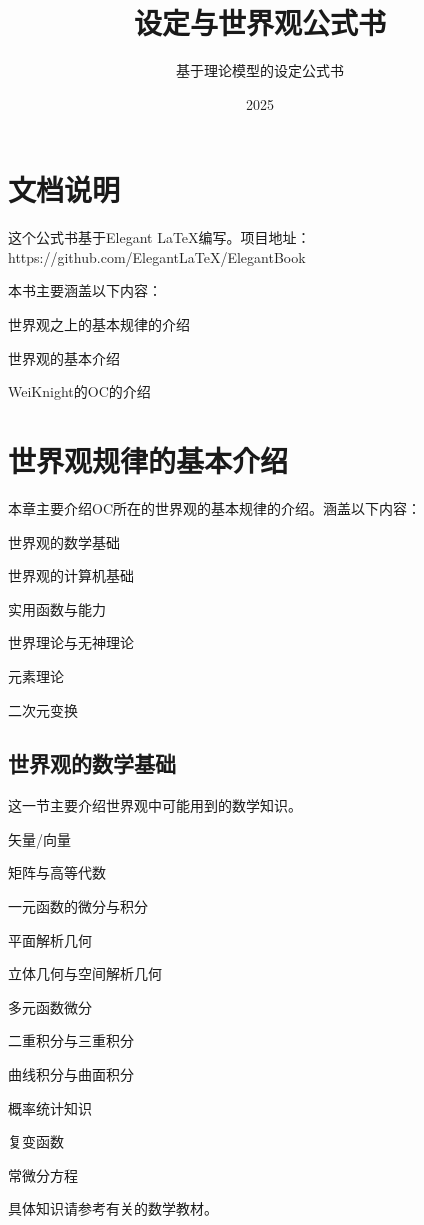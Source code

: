 \documentclass[lang=cn,newtx,10pt,scheme=chinese]{elegantbook}
\title{\wkn{}设定与世界观公式书}
\subtitle{基于理论模型的设定公式书}
\author{\wkn{}}
\date{2025}
\newcommand{\wkn}{WeiKnight}
\begin{document}
\maketitle
\frontmatter

\tableofcontents

\mainmatter

\chapter*{文档说明}
这个公式书基于Elegant \LaTeX{}编写。项目地址：https://github.com/ElegantLaTeX/ElegantBook

本书主要涵盖以下内容：
\begin{introduction}
    \item 世界观之上的基本规律的介绍
    \item 世界观的基本介绍
    \item \wkn{}的OC的介绍
\end{introduction}

\chapter{世界观规律的基本介绍}
本章主要介绍OC所在的世界观的基本规律的介绍。涵盖以下内容：
\begin{introduction}
    \item 世界观的数学基础
    \item 世界观的计算机基础
    \item 实用函数与能力
    \item 世界理论与无神理论
    \item 元素理论
    \item 二次元变换
\end{introduction}

\section{世界观的数学基础}
这一节主要介绍世界观中可能用到的数学知识。
\begin{introduction}
    \item 矢量/向量
    \item 矩阵与高等代数
    \item 一元函数的微分与积分
    \item 平面解析几何
    \item 立体几何与空间解析几何
    \item 多元函数微分
    \item 二重积分与三重积分
    \item 曲线积分与曲面积分
    \item 概率统计知识
    \item 复变函数
    \item 常微分方程
\end{introduction}
具体知识请参考有关的数学教材。
\end{document}
